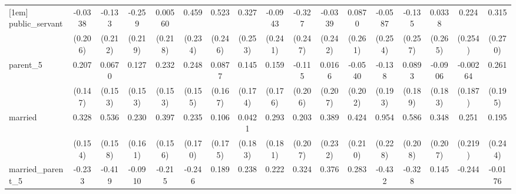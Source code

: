 {\begin{tabular}{l*{16}{c}}
[1em]
public\_servant      &     -0.0338         &      -0.133         &      -0.259         &     0.00560         &       0.459\sym{*}  &       0.523\sym{*}  &       0.327         &     -0.0943         &      -0.327         &     -0.0339         &      0.0870         &     -0.0587         &      -0.135         &      0.0338         &       0.224         &       0.315         \\
                    &     (0.206)         &     (0.212)         &     (0.219)         &     (0.218)         &     (0.234)         &     (0.246)         &     (0.253)         &     (0.241)         &     (0.247)         &     (0.242)         &     (0.261)         &     (0.254)         &     (0.257)         &     (0.265)         &     (0.254)         &     (0.270)         \\
[1em]
parent\_5            &       0.207         &      0.0670         &       0.127         &       0.232         &       0.248         &      0.0877         &       0.145         &       0.159         &      -0.115         &      0.0166         &     -0.0540         &      -0.138         &      0.0893         &     -0.0906         &    -0.00264         &       0.261         \\
                    &     (0.147)         &     (0.153)         &     (0.153)         &     (0.153)         &     (0.155)         &     (0.167)         &     (0.174)         &     (0.176)         &     (0.206)         &     (0.207)         &     (0.202)         &     (0.193)         &     (0.189)         &     (0.183)         &     (0.187)         &     (0.195)         \\
[1em]
married             &       0.328\sym{*}  &       0.536\sym{***}&       0.230         &       0.397\sym{*}  &       0.235         &       0.106         &      0.0421         &       0.293         &       0.203         &       0.389         &       0.424\sym{*}  &       0.954\sym{***}&       0.586\sym{**} &       0.348         &       0.251         &       0.195         \\
                    &     (0.154)         &     (0.158)         &     (0.161)         &     (0.156)         &     (0.170)         &     (0.175)         &     (0.183)         &     (0.181)         &     (0.207)         &     (0.232)         &     (0.210)         &     (0.228)         &     (0.208)         &     (0.207)         &     (0.219)         &     (0.244)         \\
[1em]
married\_parent\_5    &      -0.233         &      -0.419         &     -0.0910         &      -0.215         &      -0.246         &       0.189         &       0.238         &       0.222         &       0.324         &       0.376         &       0.283         &      -0.432         &      -0.328         &       0.145         &      -0.244         &     -0.0176         \\

\end{tabular}}
